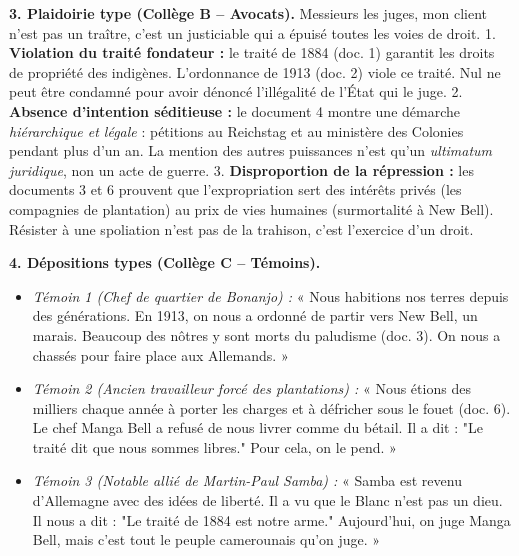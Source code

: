 \documentclass[11pt]{article}
\begin{document}
\begin{exoresolu}
\textbf{3. Plaidoirie type (Collège B -- Avocats).}
\og Messieurs les juges, mon client n'est pas un traître, c'est un justiciable qui a épuisé toutes les voies de droit.
1. \textbf{Violation du traité fondateur :} le traité de 1884 (doc. 1) garantit les droits de propriété des indigènes. L'ordonnance de 1913 (doc. 2) viole ce traité. Nul ne peut être condamné pour avoir dénoncé l'illégalité de l'État qui le juge.
2. \textbf{Absence d'intention séditieuse :} le document 4 montre une démarche \emph{hiérarchique et légale} : pétitions au Reichstag et au ministère des Colonies pendant plus d'un an. La mention des autres puissances n'est qu'un \emph{ultimatum juridique}, non un acte de guerre.
3. \textbf{Disproportion de la répression :} les documents 3 et 6 prouvent que l'expropriation sert des intérêts privés (les compagnies de plantation) au prix de vies humaines (surmortalité à New Bell). Résister à une spoliation n'est pas de la trahison, c'est l'exercice d'un droit. \fg

\textbf{4. Dépositions types (Collège C -- Témoins).}
\begin{itemize}
    \item \textit{Témoin 1 (Chef de quartier de Bonanjo) :} « Nous habitions nos terres depuis des générations. En 1913, on nous a ordonné de partir vers New Bell, un marais. Beaucoup des nôtres y sont morts du paludisme (doc. 3). On nous a chassés pour faire place aux Allemands. »
    \item \textit{Témoin 2 (Ancien travailleur forcé des plantations) :} « Nous étions des milliers chaque année à porter les charges et à défricher sous le fouet (doc. 6). Le chef Manga Bell a refusé de nous livrer comme du bétail. Il a dit : "Le traité dit que nous sommes libres." Pour cela, on le pend. »
    \item \textit{Témoin 3 (Notable allié de Martin-Paul Samba) :} « Samba est revenu d'Allemagne avec des idées de liberté. Il a vu que le Blanc n'est pas un dieu. Il nous a dit : "Le traité de 1884 est notre arme." Aujourd'hui, on juge Manga Bell, mais c'est tout le peuple camerounais qu'on juge. »
\end{itemize}


\end{exoresolu}
\end{document}
